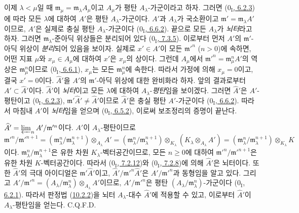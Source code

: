 이제 $\lambda<\mu$일 때
$\mathfrak m_\mu=\mathfrak m_\lambda A_\mu$이고 $A_\mu$가 평탄
$A_\lambda$-가군이라고 하자. 그러면
(\hyperref[0.6.2.3-ko]{$0_{\mathrm I}$, 6.2.3})에 따라 모든
$\lambda$에 대하여 $A'$은 평탄 $A_\lambda$-가군이다. $A'$과
$A_\lambda$가 국소환이고 $\mathfrak m'=\mathfrak m_\lambda A'$이므로,
$A'$은 실제로 충실 평탄 $A_\lambda$-가군이다
(\hyperref[0.6.6.2-ko]{$0_{\mathrm I}$, 6.6.2}). 끝으로 모든
$A_\lambda$가 \emph{뇌터}라고 하자. 그러면
$\mathfrak m_\lambda$-준아딕 위상들은 분리되어 있다
(\hyperref[0.7.3.5-ko]{$0_{\mathrm I}$, 7.3.5}). 이로부터 먼저 $A'$의
$\mathfrak m'$-아딕 위상이 \emph{분리}되어 있음을 보이자. 실제로
$x'\in A'$이 모든 $\mathfrak m'^n$ ($n>0$)에 속하면, 어떤 지표
$\mu$와 $x_\mu\in A_\mu$에 대하여 $x'$은 $x_\mu$의 상이다. 그런데
$A_\mu$에서 $\mathfrak m'^n=\mathfrak m_\mu^nA'$의 역상은
$\mathfrak m_\mu^n$이므로
(\hyperref[0.6.6.1-ko]{$0_{\mathrm I}$, 6.6.1}), $x_\mu$는 모든
$\mathfrak m_\mu^n$에 속한다. 따라서 가정에 의해 $x_\mu=0$이고,
결국 $x'=0$이다. $\widehat A'$을 $A'$의 $\mathfrak m'$-아딕 위상에
대한 완비화라 하자. 앞의 결과로부터 $A'\subset\widehat A'$이다.
$\widehat A'$이 \emph{뇌터}이고 모든 $\lambda$에 대하여
$A_\lambda$-\emph{평탄}임을 보이겠다. 그러면
$\widehat A'$은 $A'$-평탄이고
(\hyperref[0.6.2.3-ko]{$0_{\mathrm I}$, 6.2.3}),
$\mathfrak m'\widehat A'\ne\widehat A'$이므로 $\widehat A'$은 충실 평탄
$A'$-가군이다 (\hyperref[0.6.6.2-ko]{$0_{\mathrm I}$, 6.6.2}). 따라서
마침내 $A'$이 \emph{뇌터}임을 얻으며
(\hyperref[0.6.5.2-ko]{$0_{\mathrm I}$, 6.5.2}), 이로써 보조정리의
증명이 끝난다.

$\widehat A'=\varprojlim_n A'/\mathfrak m'^n$이다. $A'$이
$A_\lambda$-평탄이므로
\[
  \mathfrak m'^{n}/\mathfrak m'^{n+1}
  =(\mathfrak m_\lambda^n/\mathfrak m_\lambda^{n+1})
    \otimes_{A_\lambda}A'
  =(\mathfrak m_\lambda^n/\mathfrak m_\lambda^{n+1})
    \otimes_{K_\lambda}(K_\lambda\otimes_{A_\lambda}A')
  =(\mathfrak m_\lambda^n/\mathfrak m_\lambda^{n+1})
    \otimes_{K_\lambda}K
\]
이다. $\mathfrak m_\lambda^n/\mathfrak m_\lambda^{n+1}$은 유한 차원
$K_\lambda$-벡터공간이므로, 모든 $n\geq0$에 대하여
$\mathfrak m'^n/\mathfrak m'^{n+1}$은 유한 차원 $K$-벡터공간이다.
따라서 (\hyperref[0.7.2.12-ko]{$0_{\mathrm I}$, 7.2.12})와
(\hyperref[0.7.2.8-ko]{$0_{\mathrm I}$, 7.2.8})에 의해
$\widehat A'$은 뇌터이다. 또한 $\widehat A'$의 극대 아이디얼은
$\mathfrak m'\widehat A'$이고,
$\widehat A'/\mathfrak m'^n\widehat A'$은 $A'/\mathfrak m'^n$과
동형임을 알고 있다. 그리고
$A'/\mathfrak m'^n=(A_\lambda/\mathfrak m_\lambda^n)
\otimes_{A_\lambda}A'$이므로, $A'/\mathfrak m'^n$은 평탄
$(A_\lambda/\mathfrak m_\lambda^n)$-가군이다
(\hyperref[0.6.2.1-ko]{$0_{\mathrm I}$, 6.2.1}). 따라서 판정법
(\hyperref[0.10.2.2-fr]{10.2.2})을 뇌터 $A_\lambda$-대수
$\widehat A'$에 적용할 수 있고, 이로부터 $\widehat A'$이
$A_\lambda$-평탄임을 얻는다. C.Q.F.D.

